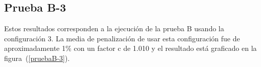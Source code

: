 
\subsection{Prueba B-3}

Estos resultados corresponden a la ejecución de la prueba B usando la configuración 3. La media de penalización de usar esta configuración fue de aproximadamente 1\% con un factor c de 1.010 y el resultado está graficado en la figura~(\ref{pruebaB-3}).




